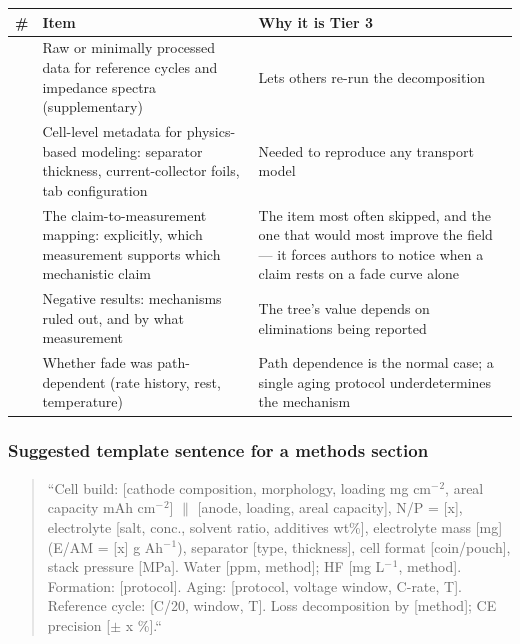 \documentclass[11pt,a4paper]{article}
\renewcommand{\arraystretch}{1.15}
\begin{document}
\begingroup\small
\setlength{\tabcolsep}{3pt}
\renewcommand{\arraystretch}{1.12}
\sloppy
\begin{tabular}{@{}>{\raggedright\arraybackslash}p{}>{\raggedright\arraybackslash}p{}>{\raggedright\arraybackslash}p{}@{}}
\hline
\textbf{\#} & \textbf{Item} & \textbf{Why it is Tier 3} \\ \hline
16 & Raw or minimally processed data for reference cycles and impedance spectra (supplementary) & Lets others re-run the decomposition \\
\hline
17 & Cell-level metadata for physics-based modeling: separator thickness, current-collector foils, tab configuration & Needed to reproduce any transport model \\
\hline
18 & The claim-to-measurement mapping: explicitly, which measurement supports which mechanistic claim & The item most often skipped, and the one that would most improve the field --- it forces authors to notice when a claim rests on a fade curve alone \\
\hline
19 & Negative results: mechanisms ruled out, and by what measurement & The tree's value depends on eliminations being reported \\
\hline
20 & Whether fade was path-dependent (rate history, rest, temperature) & Path dependence is the normal case; a single aging protocol underdetermines the mechanism \\
\hline
\end{tabular}
\endgroup



\subsubsection*{Suggested template sentence for a methods section}


\begin{quote}\textquotedblleft{}Cell build: [cathode composition, morphology, loading mg cm\ensuremath{^{-}}\ensuremath{^{2}}, areal capacity mAh cm\ensuremath{^{-}}\ensuremath{^{2}}] \ensuremath{\|} [anode, loading, areal capacity], N/P = [x], electrolyte [salt, conc., solvent ratio, additives wt\%], electrolyte mass [mg] (E/AM = [x] g Ah\ensuremath{^{-}}\ensuremath{^{1}}), separator [type, thickness], cell format [coin/pouch], stack pressure [MPa]. Water [ppm, method]; HF [mg L\ensuremath{^{-}}\ensuremath{^{1}}, method]. Formation: [protocol]. Aging: [protocol, voltage window, C-rate, T]. Reference cycle: [C/20, window, T]. Loss decomposition by [method]; CE precision [\ensuremath{\pm} x \%].\textquotedblleft{}\end{quote}
\end{document}
